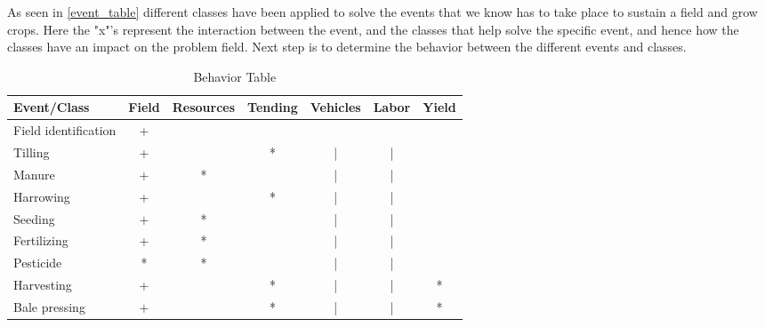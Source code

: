 As seen in \ref{event_table} different classes have been applied to solve the events that we know has to take place to sustain a field and grow crops. Here the "x"'s represent the interaction between the event, and the classes that help solve the specific event, and hence how the classes have an impact on the problem field. Next step is to determine the behavior between the different events and classes.


\begin{table}[H]
    \centering
    \begin{tabular}{|l|c|c|c|c|c|c|}
    \hline
         Event/Class & Field & Resources & Tending & Vehicles & Labor & Yield \\\hline
         Field identification & + &   &   &   &   &   \\\hline
         Tilling       & + &   & * & | & | &   \\\hline
         Manure        & + & * &   & | & | &   \\\hline
         Harrowing     & + &   & * & | & | &   \\\hline
         Seeding       & + & * &   & | & | &   \\\hline
         Fertilizing   & + & * &   & | & | &   \\\hline
         Pesticide     & * & * &   & | & | &   \\\hline
         Harvesting    & + &   & * & | & | & * \\\hline
         Bale pressing & + &   & * & | & | & * \\\hline
    \end{tabular}
    \caption{Behavior Table}
    \label{tab:behavior_table}
\end{table}


